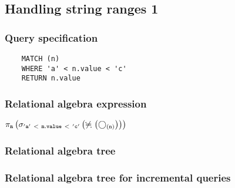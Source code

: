 	\subsection{Handling string ranges 1}

	\subsubsection*{Query specification}

	\begin{lstlisting}
	MATCH (n)
	WHERE 'a' < n.value < 'c'
	RETURN n.value
	\end{lstlisting}


	\subsubsection*{Relational algebra expression}

	$\projection{\var{n}} \left(\selection{\mathtt{'a'~<~n.value~<~'c'}} \left(\alldifferent{} \left(\getvertices{n}{}\right)\right)\right)$

	\subsubsection*{Relational algebra tree}


	\subsubsection*{Relational algebra tree for incremental queries}

